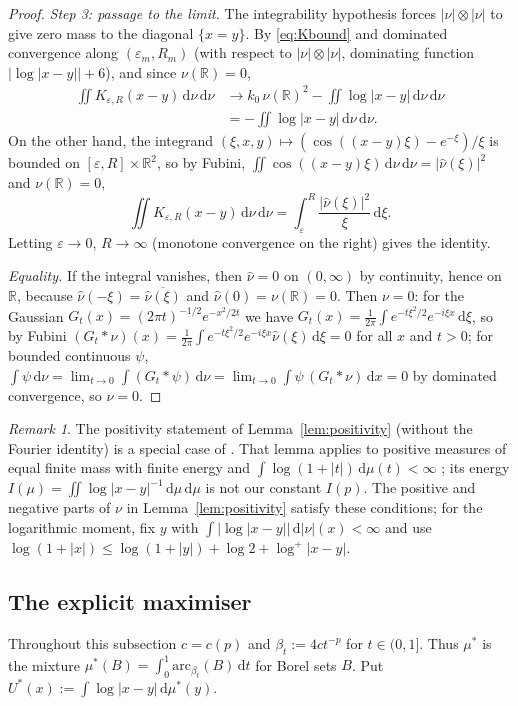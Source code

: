 \documentclass{amsart}
\theoremstyle{definition}
\theoremstyle{remark}
\newtheorem{remark}[theorem]{Remark}
\numberwithin{equation}{section}
\newcommand{\R}{\mathbb{R}}
\newcommand{\dd}{\,\mathrm{d}}
\newcommand{\arc}{\mathrm{arc}}
\begin{document}
\begin{proof}
\emph{Step 3: passage to the limit.} The integrability hypothesis forces $|\nu|\otimes|\nu|$ to give zero mass to the diagonal $\{x=y\}$.
By \eqref{eq:Kbound} and dominated convergence along $(\varepsilon_m,R_m)$ (with respect to $|\nu|\otimes|\nu|$,
dominating function $|\log|x-y||+6$), and since $\nu(\R)=0$,
\begin{align*}
  \iint K_{\varepsilon,R}(x-y)\dd\nu\dd\nu&\longrightarrow k_0\,\nu(\R)^2-\iint\log|x-y|\dd\nu\dd\nu\\
  &=-\iint\log|x-y|\dd\nu\dd\nu .
\end{align*}
On the other hand, the integrand $(\xi,x,y)\mapsto(\cos((x-y)\xi)-e^{-\xi})/\xi$ is bounded on
$[\varepsilon,R]\times\R^2$, so by Fubini, $\iint\cos((x-y)\xi)\dd\nu\dd\nu=|\hat\nu(\xi)|^2$ and $\nu(\R)=0$,
\[
  \iint K_{\varepsilon,R}(x-y)\dd\nu\dd\nu=\int_\varepsilon^R\frac{|\hat\nu(\xi)|^2}{\xi}\dd\xi .
\]
Letting $\varepsilon\to0$, $R\to\infty$ (monotone convergence on the right) gives the identity.

\emph{Equality.} If the integral vanishes, then $\hat\nu=0$ on $(0,\infty)$ by continuity, hence on $\R$, because
$\hat\nu(-\xi)=\overline{\hat\nu(\xi)}$ and $\hat\nu(0)=\nu(\R)=0$. Then $\nu=0$: for the Gaussian
$G_t(x)=(2\pi t)^{-1/2}e^{-x^2/2t}$ we have $G_t(x)=\frac1{2\pi}\int e^{-t\xi^2/2}e^{-i\xi x}\dd\xi$, so by Fubini
$(G_t*\nu)(x)=\frac1{2\pi}\int e^{-t\xi^2/2}e^{-i\xi x}\hat\nu(\xi)\dd\xi=0$ for all $x$ and $t>0$; for bounded
continuous $\psi$, $\int\psi\dd\nu=\lim_{t\to0}\int(G_t*\psi)\dd\nu=\lim_{t\to0}\int\psi\,(G_t*\nu)\dd x=0$ by
dominated convergence, so $\nu=0$.
\end{proof}

\begin{remark}\label{rem:BKMW}
The positivity statement of Lemma~\ref{lem:positivity} (without the Fourier identity) is a special case of
\cite[Lemma~2.1]{BKMW}. That lemma applies to positive measures of equal finite mass with finite energy and
$\int\log(1+|t|)\dd\mu(t)<\infty$ \cite[(1.12)]{BKMW}; its energy $I(\mu)=\iint\log|x-y|^{-1}\dd\mu\dd\mu$ is not our
constant $I(p)$. The positive and negative parts of $\nu$ in Lemma~\ref{lem:positivity} satisfy these conditions; for
the logarithmic moment, fix $y$ with $\int|\log|x-y||\dd|\nu|(x)<\infty$ and use
$\log(1+|x|)\le\log(1+|y|)+\log2+\log^+|x-y|$.
\end{remark}

\subsection{The explicit maximiser}
Throughout this subsection $c=c(p)$ and $\beta_t:=4ct^{-p}$ for $t\in(0,1]$. Thus $\mu^*$ is the mixture
$\mu^*(B)=\int_0^1\arc_{\beta_t}(B)\dd t$ for Borel sets $B$. Put $U^*(x):=\int\log|x-y|\dd\mu^*(y)$.
\end{document}
